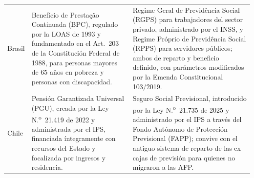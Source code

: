 \documentclass[12pt, letterpaper]{article}
\begin{document}
\begin{xltabular}{\textwidth}{P{2.1cm}Y Y}
Brasil &
Benefício de Prestação Continuada (BPC), regulado por la LOAS de 1993 y fundamentado en el Art.\ 203 de la Constitución Federal de 1988, para personas mayores de 65 años en pobreza y personas con discapacidad. &
Regime Geral de Previdência Social (RGPS) para trabajadores del sector privado, administrado por el INSS, y Regime Próprio de Previdência Social (RPPS) para servidores públicos; ambos de reparto y beneficio definido, con parámetros modificados por la Emenda Constitucional 103/2019. \\

Chile &
Pensión Garantizada Universal (PGU), creada por la Ley N.\textsuperscript{o}~21.419 de 2022 y administrada por el IPS, financiada íntegramente con recursos del Estado y focalizada por ingresos y residencia. &
Seguro Social Previsional, introducido por la Ley N.\textsuperscript{o}~21.735 de 2025 y administrado por el IPS a través del Fondo Autónomo de Protección Previsional (FAPP); convive con el antiguo sistema de reparto de las ex cajas de previsión para quienes no migraron a las AFP. \\

\end{xltabular}
\end{document}
